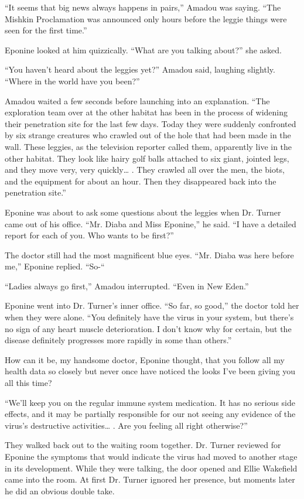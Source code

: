 \documentclass[]{article}
\begin{document}
{“It seems that big news always happens in pairs,” Amadou was saying.  “The Mishkin Proclamation was announced only hours before the leggie things were seen for the first time.”

Eponine looked at him quizzically.  “What are you talking about?” she asked.

“You haven’t heard about the leggies yet?” Amadou said, laughing slightly.  “Where in the world have you been?”

Amadou waited a few seconds before launching into an explanation.  “The exploration team over at the other habitat has been in the process of widening their penetration site for the last few days.  Today they were suddenly confronted by six strange creatures who crawled out of the hole that had been made in the wall.  These leggies, as the television reporter called them, apparently live in the other habitat.  They look like hairy golf balls attached to six giant, jointed legs, and they move very, very quickly… .  They crawled all over the men, the biots, and the equipment for about an hour.  Then they disappeared back into the penetration site.”

Eponine was about to ask some questions about the leggies when Dr.  Turner came out of his office.  “Mr.  Diaba and Miss Eponine,” he said.  “I have a detailed report for each of you.  Who wants to be first?”

The doctor still had the most magnificent blue eyes.  “Mr.  Diaba was here before me,” Eponine replied.  “So-“

“Ladies always go first,” Amadou interrupted.  “Even in New Eden.”

Eponine went into Dr.  Turner’s inner office.  “So far, so good,” the doctor told her when they were alone.  “You definitely have the virus in your system, but there’s no sign of any heart muscle deterioration.  I don’t know why for certain, but the disease definitely progresses more rapidly in some than others.”

How can it be, my handsome doctor, Eponine thought, that you follow all my health data so closely but never once have noticed the looks I’ve been giving you all this time?

“We’ll keep you on the regular immune system medication.  It has no serious side effects, and it may be partially responsible for our not seeing any evidence of the virus’s destructive activities… .  Are you feeling all right otherwise?”

They walked back out to the waiting room together.  Dr.  Turner reviewed for Eponine the symptoms that would indicate the virus had moved to another stage in its development.  While they were talking, the door opened and Ellie Wakefield came into the room.  At first Dr.  Turner ignored her presence, but moments later he did an obvious double take.

}
\end{document}
